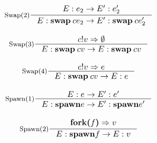 \begin{gather}
    \inference[Swap(2)]{ E : e_2 \rightarrow E' : e'_2 
                      }{ E : \textbf{swap}\: c e_2 \rightarrow
                         E' : \textbf{swap}\: c e'_2 } \\[2ex]

    \inference[Swap(3)]{ c ! v \Rightarrow \emptyset 
                      }{ E : \textbf{swap}\: c v \rightarrow
                         E : \textbf{swap}\: c v } \\[2ex] 

    \inference[Swap(4)]{ c ! v \Rightarrow e
                      }{ E : \textbf{swap}\: c v \rightarrow
                         E : e } \\[2ex] 

    \inference[Spawn(1)]{ E : e \rightarrow E' : e' }{
                         E : \textbf{spawn} e \rightarrow 
                         E' : \textbf{spawn} e'} \\[2ex]

    \inference[Spawn(2)]{ \textbf{fork(} f \textbf{)} \Rightarrow v }
                       { E : \textbf{spawn} f \rightarrow E : v }
                    
\end{gather}

